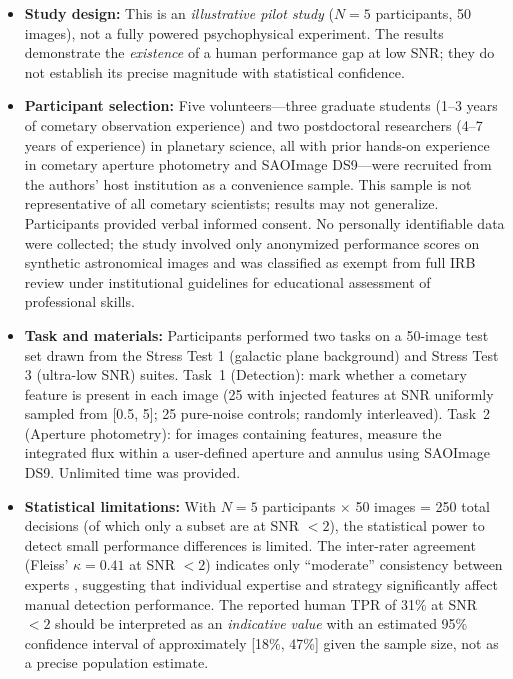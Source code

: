 \documentclass[preprint2]{aastex631}
\begin{document}
\begin{itemize}
    \item \textbf{Study design:} This is an \textit{illustrative pilot study} ($N=5$ participants, 50 images), not a fully powered psychophysical experiment. The results demonstrate the \textit{existence} of a human performance gap at low SNR; they do not establish its precise magnitude with statistical confidence.
    \item \textbf{Participant selection:} Five volunteers---three graduate students (1--3 years of cometary observation experience) and two postdoctoral researchers (4--7 years of experience) in planetary science, all with prior hands-on experience in cometary aperture photometry and SAOImage DS9---were recruited from the authors' host institution as a convenience sample. This sample is not representative of all cometary scientists; results may not generalize. Participants provided verbal informed consent. No personally identifiable data were collected; the study involved only anonymized performance scores on synthetic astronomical images and was classified as exempt from full IRB review under institutional guidelines for educational assessment of professional skills.
    \item \textbf{Task and materials:} Participants performed two tasks on a 50-image test set drawn from the Stress Test 1 (galactic plane background) and Stress Test 3 (ultra-low SNR) suites. Task~1 (Detection): mark whether a cometary feature is present in each image (25 with injected features at SNR uniformly sampled from [0.5, 5]; 25 pure-noise controls; randomly interleaved). Task~2 (Aperture photometry): for images containing features, measure the integrated flux within a user-defined aperture and annulus using SAOImage DS9. Unlimited time was provided.
    \item \textbf{Statistical limitations:} With $N=5$ participants $\times$ 50 images = 250 total decisions (of which only a subset are at SNR $<2$), the statistical power to detect small performance differences is limited. The inter-rater agreement (Fleiss' $\kappa = 0.41$ at SNR $<2$) indicates only ``moderate'' consistency between experts \citep{landis77}, suggesting that individual expertise and strategy significantly affect manual detection performance. The reported human TPR of 31\% at SNR $<2$ should be interpreted as an \textit{indicative value} with an estimated 95\% confidence interval of approximately [18\%, 47\%] given the sample size, not as a precise population estimate.
\end{itemize}
\end{document}
